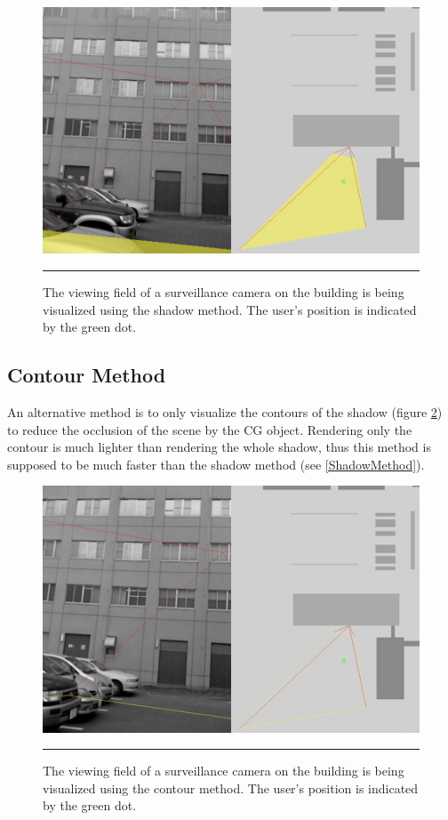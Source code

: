 \begin{figure}[htbp]
	\centering
	\includegraphics[width=14cm]{./Primitives/theory_shadow.png}
	\rule{35em}{0.5pt}
	\caption[Shadow method]{The viewing field of a surveillance camera on the building is being visualized using the shadow method. The user's position is indicated by the green dot.}
	\label{fig:ShadowMethod}
\end{figure}

\subsection{Contour Method}

An alternative method is to only visualize the contours of the shadow (figure \ref{fig:ContourMethod}) to reduce the occlusion of the scene by the CG object. Rendering only the contour is much lighter than rendering the whole shadow, thus this method is supposed to be much faster than the shadow method (see \ref{ShadowMethod}).

\begin{figure}[htbp]
	\centering
	\includegraphics[width=14cm]{./Primitives/theory_contour.png}
	\rule{35em}{0.5pt}
	\caption[Contour method]{The viewing field of a surveillance camera on the building is being visualized using the contour method. The user's position is indicated by the green dot.}
	\label{fig:ContourMethod}
\end{figure}

